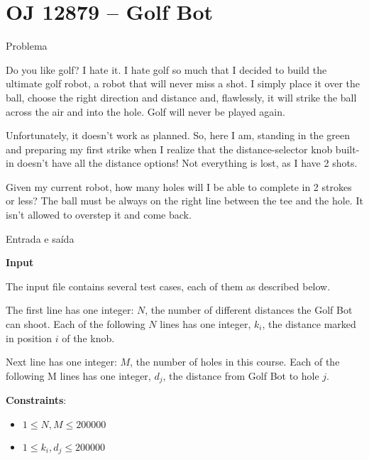 \section{OJ 12879 -- Golf Bot}

\begin{frame}[fragile]{Problema}

Do you like golf? I hate it. I hate golf so much that I decided to build the ultimate golf robot,
a robot that will never miss a shot. I simply place it over the ball, choose the right direction
and distance and, flawlessly, it will strike the ball across the air and into the hole.  Golf will
never be played again.

Unfortunately, it doesn’t work as planned. So, here I am, standing in the green and preparing my
first strike when I realize that the distance-selector knob built-in doesn’t have all the distance
options! Not everything is lost, as I have 2 shots.

Given my current robot, how many holes will I be able to complete in 2 strokes or less? The ball
must be always on the right line between the tee and the hole.  It isn’t allowed to overstep it
and come back.

\end{frame}

\begin{frame}[fragile]{Entrada e saída}

\textbf{Input}

The input file contains several test cases, each of them as described below.

The first line has one integer: $N$, the number of different distances the Golf Bot can shoot. Each
of the following $N$ lines has one integer, $k_i$, the distance marked in position $i$ of the knob.

Next line has one integer: $M$, the number of holes in this course. Each of the following M lines
has one integer, $d_j$, the distance from Golf Bot to hole $j$.

\textbf{Constraints}:

\begin{itemize}
    \item $1\leq N, M\leq 200 000$
    \item $1\leq k_i , d_j\leq 200 000$
\end{itemize}

\end{frame}

